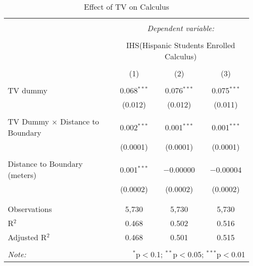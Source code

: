 
\begin{table}[!htbp] \centering 
  \caption{Effect of TV on Calculus} 
  \label{} 
\begin{tabular}{@{\extracolsep{-2pt}}lccc} 
\\[-1.8ex]\hline 
\hline \\[-1.8ex] 
 & \multicolumn{3}{c}{\textit{Dependent variable:}} \\ 
\cline{2-4} 
\\[-1.8ex] & \multicolumn{3}{c}{IHS(Hispanic Students Enrolled Calculus)} \\ 
\\[-1.8ex] & (1) & (2) & (3)\\ 
\hline \\[-1.8ex] 
 TV dummy & 0.068$^{***}$ & 0.076$^{***}$ & 0.075$^{***}$ \\ 
  & (0.012) & (0.012) & (0.011) \\ 
  & & & \\ 
 TV Dummy $\times$ Distance to Boundary & 0.002$^{***}$ & 0.001$^{***}$ & 0.001$^{***}$ \\ 
  & (0.0001) & (0.0001) & (0.0001) \\ 
  & & & \\ 
 Distance to Boundary (meters) & 0.001$^{***}$ & $-$0.00000 & $-$0.00004 \\ 
  & (0.0002) & (0.0002) & (0.0002) \\ 
  & & & \\ 
\hline \\[-1.8ex] 
Observations & 5,730 & 5,730 & 5,730 \\ 
R$^{2}$ & 0.468 & 0.502 & 0.516 \\ 
Adjusted R$^{2}$ & 0.468 & 0.501 & 0.515 \\ 
\hline 
\hline \\[-1.8ex] 
\textit{Note:}  & \multicolumn{3}{r}{$^{*}$p$<$0.1; $^{**}$p$<$0.05; $^{***}$p$<$0.01} \\ 
\end{tabular} 
\end{table} 
